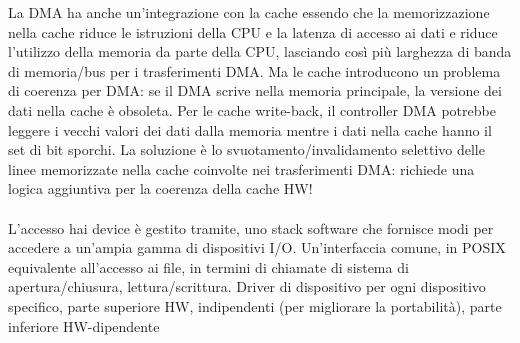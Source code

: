 \hspace{-15pt}La DMA ha anche un'integrazione con la cache essendo che la memorizzazione nella cache riduce le istruzioni della CPU e la latenza di accesso ai dati e riduce l'utilizzo della memoria da parte della CPU, lasciando così più larghezza di banda di memoria/bus per i trasferimenti DMA. Ma le cache introducono un problema di coerenza per DMA: se il DMA scrive nella memoria principale, la versione dei dati nella cache è obsoleta. Per le cache write-back, il controller DMA potrebbe leggere i vecchi valori dei dati dalla memoria mentre i dati nella cache hanno il set di bit sporchi. La soluzione è lo svuotamento/invalidamento selettivo delle linee memorizzate nella cache 
coinvolte nei trasferimenti DMA: richiede una logica aggiuntiva per la coerenza della cache HW!\\\\
L'accesso hai device è gestito tramite, uno stack software che fornisce modi per accedere a un'ampia gamma di dispositivi I/O. 
Un'interfaccia comune, in POSIX equivalente all'accesso ai file, in termini di chiamate di sistema 
di apertura/chiusura, lettura/scrittura. Driver di dispositivo per ogni dispositivo specifico, parte superiore HW, 
indipendenti (per migliorare la portabilità), parte inferiore HW-dipendente


